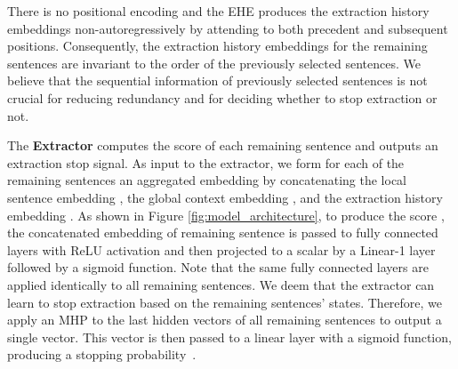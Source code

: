 \documentclass[11pt]{article}
\begin{document}
There is no positional encoding and the EHE produces the extraction history embeddings non-autoregressively by attending to both precedent and subsequent positions. Consequently, the extraction history embeddings   for the remaining sentences are invariant to the order of the previously selected sentences. We believe that the sequential information of previously selected sentences is not crucial for reducing redundancy and for deciding whether to stop extraction or not.


The \textbf{Extractor} computes the score of each remaining sentence and outputs an extraction stop signal. As input to the extractor, we form for each of the remaining sentences  an aggregated embedding by concatenating the local sentence embedding , the global context embedding , and the extraction history embedding . As shown in Figure \ref{fig:model_architecture}, to produce the score , the concatenated embedding of remaining sentence  is passed to fully connected layers with ReLU activation and then projected to a scalar by a Linear-1 layer followed by a sigmoid function. Note that the same fully connected layers are applied identically to all remaining sentences. We deem that the extractor can learn to stop extraction based on the remaining sentences' states. Therefore, we apply an MHP to the last hidden vectors of all remaining sentences to output a single vector. This vector is then passed to a linear layer with a sigmoid function, producing a stopping probability~.
\end{document}
